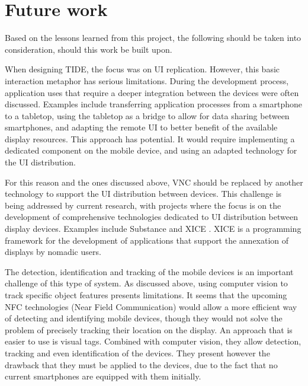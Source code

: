 \section{Future work}
\label{sec:fw}

Based on the lessons learned from this project, the following should be taken into consideration, should this work be built upon.

When designing TIDE, the focus was on UI replication.
However, this basic interaction metaphor has serious limitations.
During the development process, application uses that require a deeper integration between the devices were often discussed.
Examples include transferring application processes from a smartphone to a tabletop, using the tabletop as a bridge to allow for data sharing between smartphones, and adapting the remote UI to better benefit of the available display resources.
This approach has potential.
It would require implementing a dedicated component on the mobile device, and using an adapted technology for the UI distribution.

For this reason and the ones discussed above, VNC should be replaced by another technology to support the UI distribution between devices.
This challenge is being addressed by current research, with projects where the focus is on the development of comprehensive technologies dedicated to UI distribution between display devices.
Examples include Substance \citep{Gjerlufsen:2011:substance} and XICE \citep{Arthur:2011:xice}.
XICE is a programming framework for the development of applications that support the annexation of displays by nomadic users.

The detection, identification and tracking of the mobile devices is an important challenge of this type of system.
As discussed above, using computer vision to track specific object features presents limitations.
It seems that the upcoming NFC technologies (Near Field Communication) would allow a more efficient way of detecting and identifying mobile devices, though they would not solve the problem of precisely tracking their location on the display.
An approach that is easier to use is visual tags.
Combined with computer vision, they allow detection, tracking and even identification of the devices.
They present however the drawback that they must be applied to the devices, due to the fact that no current smartphones are equipped with them initially.

